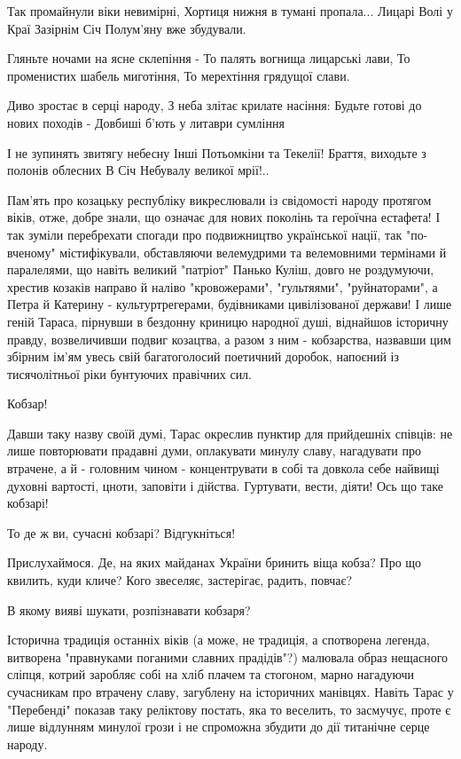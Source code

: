 Так промайнули віки невимірні,
Хортиця нижня в тумані пропала...
Лицарі Волі у Краї Зазірнім
Січ Полум'яну вже збудували.

Гляньте ночами на ясне склепіння -
То палять вогнища лицарські лави,
То променистих шабель миготіння,
То мерехтіння грядущої слави.

Диво зростає в серці народу,
З неба злітає крилате насіння:
Будьте готові до нових походів -
Довбиші б'ють у литаври сумління

І не зупинять звитягу небесну
Інші Потьомкіни та Текелії!
Браття, виходьте з полонів облесних
В Січ Небувалу великої мрії!..

Пам'ять про козацьку республіку викреслювали із свідомості народу протягом
віків, отже, добре знали, що означає для нових поколінь та героїчна естафета! І
так зуміли перебрехати спогади про подвижництво української нації, так
"по-вченому" містифікували, обставляючи велемудрими та велемовними термінами й
паралелями, що навіть великий "патріот" Панько Куліш, довго не роздумуючи,
хрестив козаків направо й наліво "кровожерами", "гультяями", "руйнаторами", а
Петра й Катерину - культуртрегерами, будівниками цивілізованої держави! І лише
геній Тараса, пірнувши в бездонну криницю народної душі, віднайшов історичну
правду, возвеличивши подвиг козацтва, а разом з ним - кобзарства, назвавши цим
збірним ім'ям увесь свій багатоголосий поетичний доробок, напоєний із
тисячолітньої ріки бунтуючих правічних сил.

Кобзар!

Давши таку назву своїй думі, Тарас окреслив пунктир для прийдешніх співців: не
лише повторювати прадавні думи, оплакувати минулу славу, нагадувати про
втрачене, а й - головним чином - концентрувати в собі та довкола себе найвищі
духовні вартості, цноти, заповіти і дійства. Гуртувати, вести, діяти! Ось що
таке кобзарі!

То де ж ви, сучасні кобзарі? Відгукніться!

Прислухаймося. Де, на яких майданах України бринить віща кобза? Про що квилить,
куди кличе? Кого звеселяє, застерігає, радить, повчає?

В якому вияві шукати, розпізнавати кобзаря?

Історична традиція останніх віків (а може, не традиція, а спотворена легенда,
витворена "правнуками поганими славних прадідів"?) малювала образ нещасного
сліпця, котрий заробляє собі на хліб плачем та стогоном, марно нагадуючи
сучасникам про втрачену славу, загублену на історичних манівцях. Навіть Тарас у
"Перебенді" показав таку реліктову постать, яка то веселить, то засмучує, проте
є лише відлунням минулої грози і не спроможна збудити до дії титанічне серце
народу.

